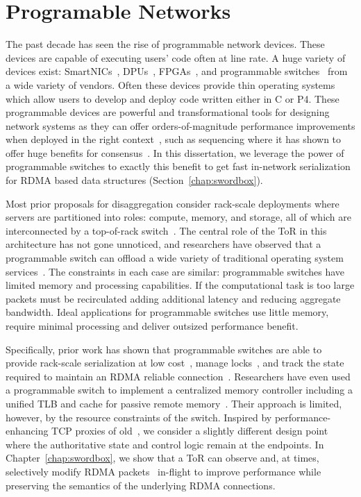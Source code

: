 \documentclass[12pt]{ucsddissertation}
\begin{document}
\section{Programable Networks}
\label{sec:programmable-networks}


The past decade has seen the rise of programmable network devices. These devices are capable of
executing users' code often at line rate. A huge variety of devices exist:
SmartNICs~\cite{fairnic,e3,ipipe,floem}, DPUs~\cite{dsnf},
FPGAs~\cite{azure-smartnic,clio,catapult,supernic}, and programmable
switches~\cite{p4,netchain,netcache,netlock} from a wide variety of vendors. Often these devices
provide thin operating systems which allow users to develop and deploy code written either in C or
P4. These programmable devices are powerful and transformational tools for designing network systems
as they can offer orders-of-magnitude performance improvements when deployed in the right
context~\cite{when-computer}, such as sequencing where it has shown to offer huge benefits for
consensus~\cite{eris, nopaxos}. In this dissertation, we leverage the power of programmable switches
to exactly this benefit to get fast in-network serialization for RDMA based data structures
(Section~\ref{chap:swordbox}).

Most prior proposals for disaggregation consider rack-scale deployments where servers are
partitioned into roles: compute, memory, and storage, all of which are interconnected by a
top-of-rack switch~\cite{disandapp,the-machine,intel-rack,firebox,legoos}. The central role of the
ToR in this architecture has not gone unnoticed, and researchers have observed that a programmable
switch can offload a wide variety of traditional operating system
services~\cite{disandapp,mind,netlock,netkv,netchain,netcache}. The constraints in each case are
similar: programmable switches have limited memory and processing capabilities. If the computational
task is too large packets must be recirculated adding additional latency and reducing aggregate
bandwidth. Ideal applications for programmable switches use little memory, require minimal
processing and deliver outsized performance benefit.

Specifically, prior work has shown that programmable switches are able to provide rack-scale
serialization at low cost~\cite{eris,no-paxos,when-computer}, manage
locks~\cite{netlock}, and track the state required to maintain an RDMA reliable
connection~\cite{tea}. Researchers have even used a programmable switch to implement a centralized
memory controller including a unified TLB and cache for passive remote memory~\cite{mind}. Their
approach is limited, however, by the resource constraints of the switch. Inspired by
performance-enhancing TCP proxies of old~\cite{snoop,rfc3135}, we consider a slightly different
design point where the authoritative state and control logic remain at the endpoints. In
Chapter~\ref{chap:swordbox}, we show that a ToR can observe and, at times, selectively modify RDMA
packets~\cite{switchml} in-flight to improve performance while preserving the
semantics of the underlying RDMA connections.
\end{document}
